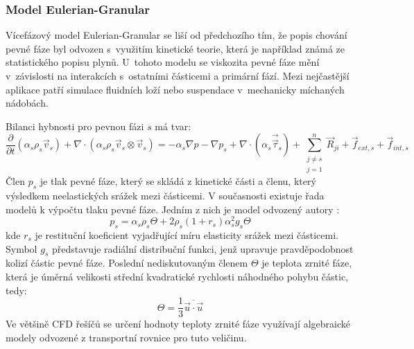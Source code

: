 \subsubsection{Model Eulerian-Granular}
\label{sec:egm}
Vícefázový model Eulerian-Granular se liší od předchozího tím, že  popis chování pevné fáze byl odvozen s~využitím kinetické teorie, která je například známá ze statistického popisu plynů. U~tohoto modelu se viskozita pevné fáze mění v~závislosti na interakcích s~ostatními částicemi a primární fází. Mezi nejčastější aplikace patří simulace fluidních loží nebo suspendace v~mechanicky míchaných nádobách.

Bilanci hybnosti pro pevnou fázi $s$ má tvar:
\begin{equation}
	\frac{\partial}{\partial t} \left(\alpha_{s}\rho_{s}\vec{v}_{s}\right) + \nabla \cdot (\alpha_{s}\rho_{s} \vec{v}_{s} \otimes \vec{v}_{s}) = -\alpha_{s} \nabla p - \nabla p_{s} + \nabla \cdot \left(\alpha_{s} \vec{\vec{\tau}}_{s} \right) +\sum_{\substack{ j \neq s \\ j=1}}^{n} \vec{R}_{ji} + \vec{f}_{ext,s} + \vec{f}_{int,s}
	\label{eq:moms}
\end{equation}
Člen $p_{s}$ je tlak pevné fáze, který se skládá z kinetické části a členu, který výsledkem neelastických srážek mezi částicemi. V současnosti existuje řada modelů k výpočtu tlaku pevné fáze. Jedním z nich je model odvozený autory \citet{lun84}:
\begin{equation}
	p_{s} = \alpha_{s}\rho_{s}\Theta + 2\rho_{s}\left(1 + r_{s} \right) \alpha_{s}^{2}g_{s}\Theta
	\label{eq:ps}
\end{equation}
kde $r_{s}$ je restituční koeficient vyjadřující míru elasticity srážek mezi částicemi. Symbol $g_{s}$ představuje radiální distribuční funkci, jenž upravuje pravděpodobnost kolizí částic pevné fáze. Poslední nediskutovaným členem $\Theta$ je teplota zrnité fáze, která je úměrná velikosti střední kvadratické rychlosti náhodného pohybu částic, tedy: 
\begin{equation}
	\Theta = \frac{1}{3} \overline{ \vec{u} \cdot \vec{u}}
	\label{eq:gtemp}
\end{equation}
Ve většině CFD řešíčů se určení hodnoty teploty zrnité fáze využívají algebraické modely odvozené z transportní rovnice pro tuto veličinu.


